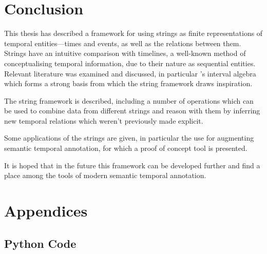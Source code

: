 \documentclass[a4paper,12pt,leqno]{article}
\begin{document}
\section{Conclusion}\label{sec:conclusion}
This thesis has described a framework for using strings as finite representations of temporal entities---times and events, as well as the relations between them. Strings have an intuitive comparison with timelines, a well-known method of conceptualising temporal information, due to their nature as sequential entities. Relevant literature was examined and discussed, in particular \citet{allen1983maintaining}'s interval algebra which forms a strong basis from which the string framework draws inspiration.

The string framework is described, including a number of operations which can be used to combine data from different strings and reason with them by inferring new temporal relations which weren't previously made explicit.

Some applications of the strings are given, in particular the use for augmenting semantic temporal annotation, for which a proof of concept tool is presented.

It is hoped that in the future this framework can be developed further and find a place among the tools of modern semantic temporal annotation.



\newpage
\pagestyle{empty}
\onehalfspacing



\newpage

\section*{Appendices}

\subsection*{Python Code}
\end{document}
